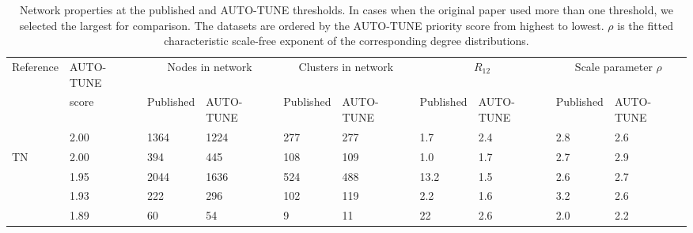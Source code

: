 \documentclass[utf8]{FrontiersinHarvard} %
\begin{document}
\begin{table}[h!]
	\caption{Network properties at the published and AUTO-TUNE thresholds. In cases when the original paper used more than one threshold, we selected the largest for comparison. The datasets are ordered by the AUTO-TUNE priority score from highest to lowest. $\rho$ is the fitted characteristic scale-free exponent of the corresponding degree distributions.}
  \label{tab:paperComparisonProp}
	\vspace{10pt}
	\centering
	\begin{ssmall}
		\begin{tabular}{llllllllll}
			\hline
			Reference                        & AUTO-TUNE & \multicolumn{2}{c}{Nodes in network} & \multicolumn{2}{c}{Clusters in network} & \multicolumn{2}{c}{$R_{12}$} & \multicolumn{2}{c}{Scale parameter $\rho$}                                                 \\
			                                 & score     & Published                            & AUTO-TUNE                               & Published                    & AUTO-TUNE                                  & Published & AUTO-TUNE & Published & AUTO-TUNE \\
			\hline
			\cite{Li:2022aa}                 & 2.00      & 1364                                 & 1224                                    & 277                          & 277                                        & 1.7       & 2.4       & 2.8       & 2.6       \\
			\cite{chato_public_2020} TN      & 2.00      & 394                                  & 445                                     & 108                          & 109                                        & 1.0       & 1.7       & 2.7       & 2.9       \\
			\cite{rhee_national_2019}        & 1.95      & 2044                                 & 1636                                    & 524                          & 488                                        & 13.2      & 1.5       & 2.6       & 2.7       \\
			\cite{bbosa_short_2020}          & 1.93      & 222                                  & 296                                     & 102                          & 119                                        & 2.2       & 1.6       & 3.2       & 2.6       \\
			\citet{dalai_combining_2018}     & 1.89      & 60                                   & 54                                      & 9                            & 11                                         & 22        & 2.6       & 2.0       & 2.2       \\ %

\end{tabular}
\end{ssmall}
\end{table}
\end{document}
